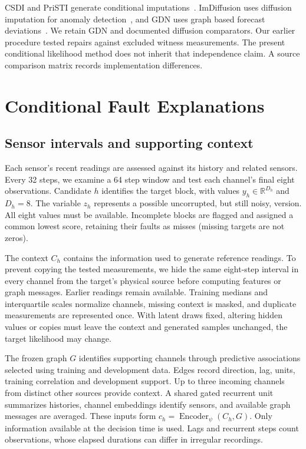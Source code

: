 \documentclass[conference]{IEEEtran}
\newcommand{\1}{\mathbf{1}}
\begin{document}
CSDI and PriSTI generate conditional imputations~\cite{csdi,pristi}. ImDiffusion uses diffusion imputation for anomaly detection~\cite{imdiffusion}, and GDN uses graph based forecast deviations~\cite{gdn}. We retain GDN and documented diffusion comparators. Our earlier procedure tested repairs against excluded witness measurements. The present conditional likelihood method does not inherit that independence claim. A source comparison matrix records implementation differences.





\section{Conditional Fault Explanations}

\subsection{Sensor intervals and supporting context}
Each sensor's recent readings are assessed against its history and related sensors. Every 32 steps, we examine a 64 step window and test each channel's final eight observations. Candidate $h$ identifies the target block, with values $y_h\in\mathbb R^{D_h}$ and $D_h=8$. The variable $z_h$ represents a possible uncorrupted, but still noisy, version. All eight values must be available. Incomplete blocks are flagged and assigned a common lowest score, retaining their faults as misses (missing targets are not zeros).

The context $C_h$ contains the information used to generate reference readings. To prevent copying the tested measurements, we hide the same eight-step interval in every channel from the target's physical source before computing features or graph messages. Earlier readings remain available. Training medians and interquartile scales normalize channels, missing context is masked, and duplicate measurements are represented once. With latent draws fixed, altering hidden values or copies must leave the context and generated samples unchanged, the target likelihood may change.

The frozen graph $G$ identifies supporting channels through predictive associations selected using training and development data. Edges record direction, lag, units, training correlation and development support. Up to three incoming channels from distinct other sources provide context. A shared gated recurrent unit summarizes histories, channel embeddings identify sensors, and available graph messages are averaged. These inputs form $c_h=\operatorname{Encoder}_{\psi}(C_h,G)$. Only information available at the decision time is used. Lags and recurrent steps count observations, whose elapsed durations can differ in irregular recordings.
\end{document}
